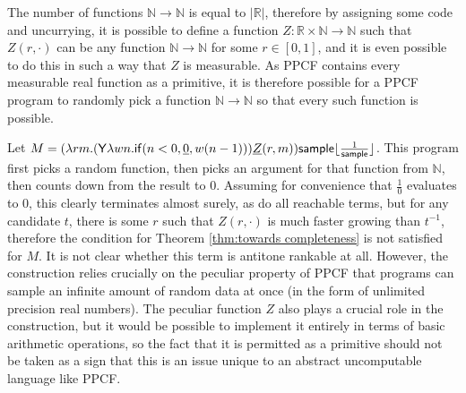 \begin{example}
The number of functions $\mathbb N \to \mathbb N$ is equal to $|\mathbb R|$, therefore by assigning some code and uncurrying, it is possible to define a function $Z : \mathbb R \times \mathbb N \to \mathbb N$ such that $Z(r, \cdot)$ can be any function $\mathbb N \to \mathbb N$ for some $r \in [0,1]$, and it is even possible to do this in such a way that $Z$ is measurable. As PPCF contains every measurable real function as a primitive, it is therefore possible for a PPCF program to randomly pick a function $\mathbb N \to \mathbb N$ so that every such function is possible.

Let $M = (\lambda r m. (\mathsf{Y} \lambda w n. \mathsf{if}(n < 0, \underline 0, w (n-1))) \underline Z(r, m)) \mathsf{sample} \lfloor \frac 1 {\mathsf{sample}} \rfloor$. This program first picks a random function, then picks an argument for that function from $\mathbb N$, then counts down from the result to 0. Assuming for convenience that $\frac 1 0$ evaluates to $0$, this clearly terminates almost surely, as do all reachable terms, but for any candidate $t$, there is some $r$ such that $Z(r, \cdot)$ is much faster growing than $t^{-1}$, therefore the condition for Theorem \ref{thm:towards completeness} is not satisfied for $M$.  It is not clear whether this term is antitone rankable at all. However, the construction relies crucially on the peculiar property of PPCF that programs can sample an infinite amount of random data at once (in the form of unlimited precision real numbers). The peculiar function $Z$ also plays a crucial role in the construction, but it would be possible to implement it entirely in terms of basic arithmetic operations, so the fact that it is permitted as a primitive should not be taken as a sign that this is an issue unique to an abstract uncomputable language like PPCF.
\end{example}

